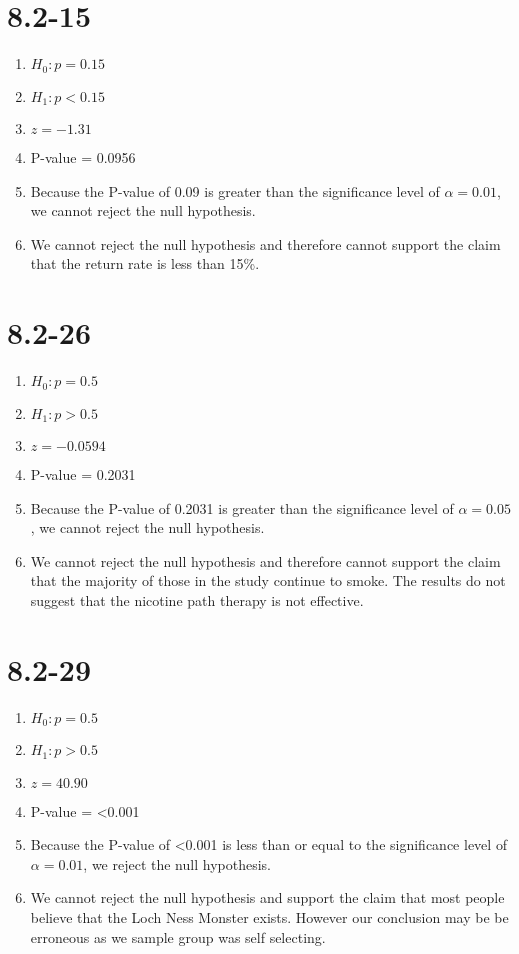 \documentclass[12pt,fleqn]{article}
\newcommand{\chapter}{8.2}
\newcommand{\problem}[1]{\vspace{5ex}\section*{\chapter-#1}}
\begin{document}
\problem{15}
\begin{enumerate}[label=\alph*.]
\item $H_0: p = 0.15$
\item $H_1: p < 0.15$
\item $z = -1.31$
\item P-value = 0.0956
\item Because the P-value of 0.09 is greater than the significance level of $\alpha = 0.01$, we cannot reject the null hypothesis.
\item We cannot reject the null hypothesis and therefore cannot support the claim that the return rate is less than 15\%.
\end{enumerate}


\problem{26}
\begin{enumerate}[label=\alph*.]
\item $H_0: p = 0.5$
\item $H_1: p > 0.5$
\item $z = -0.0594$
\item P-value = 0.2031
\item Because the P-value of 0.2031 is greater than the significance level of $\alpha = 0.05$, we cannot reject the null hypothesis.
\item We cannot reject the null hypothesis and therefore cannot support the claim that the majority of those in the study continue to smoke. The results do not suggest that the nicotine path therapy is not effective.
\end{enumerate}


\problem{29}
\begin{enumerate}[label=\alph*.]
\item $H_0: p = 0.5$
\item $H_1: p > 0.5$
\item $z = 40.90$
\item P-value = <0.001
\item Because the P-value of <0.001 is less than or equal to the significance level of $\alpha = 0.01$, we reject the null hypothesis.
\item We cannot reject the null hypothesis and support the claim that most people believe that the Loch Ness Monster exists. However our conclusion may be be erroneous as we sample group was self selecting.
\end{enumerate}
\end{document}
